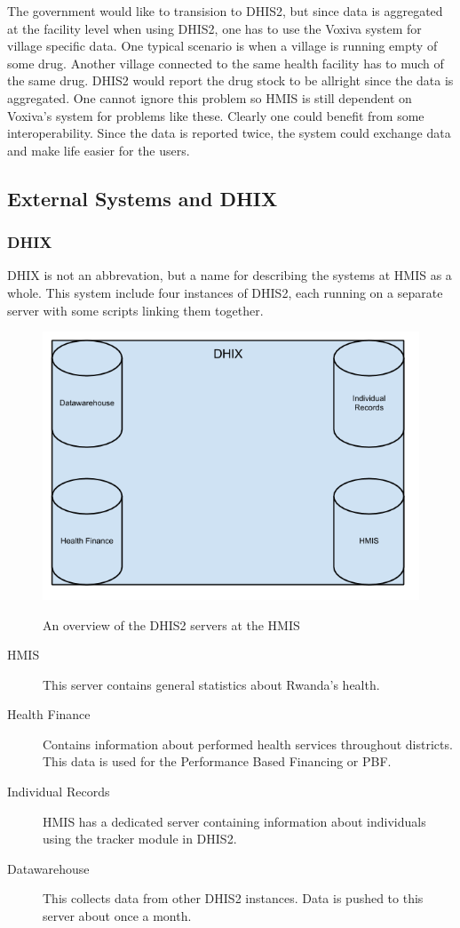 The government would like to transision to DHIS2, but since data is aggregated at the facility level when using DHIS2, one has to use the Voxiva system for village specific data.
One typical scenario is when a village is running empty of some drug. Another village connected to the same health facility has to much of the same drug. DHIS2 would report the drug stock to be allright since the data is aggregated.
One cannot ignore this problem so HMIS is still dependent on Voxiva's system for problems like these.  
Clearly one could benefit from some interoperability. Since the data is reported twice, the system could exchange data and make life easier for the users. 

\subsection{External Systems and DHIX}
\subsubsection{DHIX}
DHIX is not an abbrevation, but a name for describing the systems at HMIS as a whole. This system include four instances of DHIS2, each running on a separate server with some scripts linking them together.
\begin{figure}
\centering
\includegraphics[width=12cm]{empirical/images/dhix_overview}
\label{fig:dhix_overview}
\caption{An overview of the DHIS2 servers at the HMIS}
\end{figure}

\begin{description}
\item[HMIS]This server contains general statistics about Rwanda's health.
\item[Health Finance]Contains information about performed health services throughout districts. This data is used for the Performance Based Financing or PBF. 
\item[Individual Records]HMIS has a dedicated server containing information about individuals using the tracker module in DHIS2.
\item[Datawarehouse]This collects data from other DHIS2 instances. Data is pushed to this server about once a month.
\end{description}


